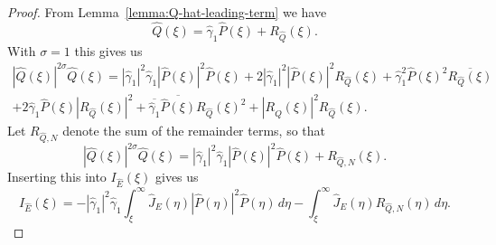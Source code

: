 \documentclass[11pt]{article}
\newcommand{\conj}[1]{\overline{#1}}
\begin{document}
\begin{proof}
  From Lemma~\ref{lemma:Q-hat-leading-term} we have
  \begin{equation*}
    \hat{Q}(\xi) = \hat{\gamma}_{1}\hat{P}(\xi) + R_{\hat{Q}}(\xi).
  \end{equation*}
  With \(\sigma = 1\) this gives us
  \begin{multline*}
    |\hat{Q}(\xi)|^{2\sigma}\hat{Q}(\xi)
    = |\hat{\gamma}_{1}|^{2}\hat{\gamma}_{1}|\hat{P}(\xi)|^{2}\hat{P}(\xi)
    + 2|\hat{\gamma}_{1}|^{2}|\hat{P}(\xi)|^{2} R_{\hat{Q}}(\xi)
    + \hat{\gamma}_{1}^{2}\hat{P}(\xi)^{2}\conj{R_{\hat{Q}}(\xi)}\\
    + 2\hat{\gamma}_{1}\hat{P}(\xi) |R_{\hat{Q}}(\xi)|^{2}
    + \conj{\hat{\gamma}_{1}}\conj{\hat{P}(\xi)} R_{\hat{Q}}(\xi)^{2}
    + |R_{\hat{Q}}(\xi)|^{2} R_{\hat{Q}}(\xi).
  \end{multline*}
  Let \(R_{\hat{Q},N}\) denote the sum of the remainder terms, so that
  \begin{equation*}
    |\hat{Q}(\xi)|^{2\sigma}\hat{Q}(\xi) = |\hat{\gamma}_{1}|^{2}\hat{\gamma}_{1}|\hat{P}(\xi)|^{2}\hat{P}(\xi)
    + R_{\hat{Q},N}(\xi).
  \end{equation*}
  Inserting this into \(I_{\hat{E}}(\xi)\) gives us
  \begin{equation*}
    I_{\hat{E}}(\xi)
    = -|\hat{\gamma}_{1}|^{2}\hat{\gamma}_{1}\int_{\xi}^{\infty} \hat{J}_{E}(\eta)|\hat{P}(\eta)|^{2}\hat{P}(\eta)\,d\eta
    - \int_{\xi}^{\infty} \hat{J}_{E}(\eta)R_{\hat{Q},N}(\eta)\,d\eta.
  \end{equation*}


\end{proof}
\end{document}
